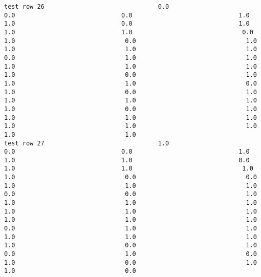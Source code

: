 \documentclass[11pt]{article}
\begin{document}
\begin{verbatim}
test row 26                               0.0                             0.0                             0.0                             1.0                             1.0                             0.0                             1.0                             1.0                             1.0                              0.0                              1.0                              0.0                              1.0                              1.0                              1.0                              1.0                              0.0                              1.0                              1.0                              1.0                              1.0                              1.0                              1.0                              0.0                              1.0                              1.0                              1.0                              0.0                              1.0                              0.0                              1.0                              1.0                              1.0                              1.0                              1.0                              0.0                              1.0                              1.0                              1.0                              1.0                              1.0                              1.0                              1.0                              1.0                              1.0
test row 27                               1.0                             0.0                             0.0                             1.0                             1.0                             1.0                             0.0                             1.0                             1.0                              1.0                              1.0                              0.0                              0.0                              1.0                              1.0                              1.0                              0.0                              0.0                              1.0                              1.0                              1.0                              1.0                              1.0                              1.0                              1.0                              1.0                              1.0                              1.0                              0.0                              1.0                              1.0                              1.0                              1.0                              1.0                              1.0                              0.0                              1.0                              0.0                              1.0                              0.0                              1.0                              0.0                              1.0                              1.0                              0.0

\end{verbatim}
\end{document}

